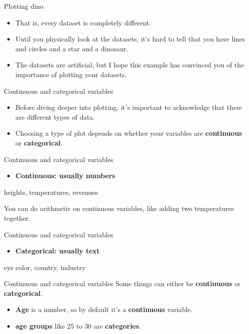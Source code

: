 \documentclass[
  ignorenonframetext,
]{beamer}
\providecommand{\tightlist}{%
  \setlength{\itemsep}{0pt}\setlength{\parskip}{0pt}}
\begin{document}
\begin{frame}{Plotting dino}
\label{plotting-dino-1}
\begin{itemize}
\item
  That is, every dataset is completely different.
\item
  Until you physically look at the datasets, it's hard to tell that you
  have lines and circles and a star and a dinosaur.
\item
  The datasets are artificial, but I hope this example has convinced you
  of the importance of plotting your datasets.
\end{itemize}
\end{frame}

\begin{frame}{Continuous and categorical variables}
\label{continuous-and-categorical-variables}
\begin{itemize}
\item
  Before diving deeper into plotting, it's important to acknowledge that
  there are different types of data.
\item
  Choosing a type of plot depends on whether your variables are
  \textbf{continuous} or \textbf{categorical}.
\end{itemize}
\end{frame}

\begin{frame}{Continuous and categorical variables}
\label{continuous-and-categorical-variables-1}
\begin{itemize}
\tightlist
\item
  \textbf{Continuous: usually numbers}
\end{itemize}

heights, temperatures, revenues

You can do arithmetic on continuous variables, like adding two
temperatures together.
\end{frame}

\begin{frame}{Continuous and categorical variables}
\label{continuous-and-categorical-variables-2}
\begin{itemize}
\tightlist
\item
  \textbf{Categorical: usually text}
\end{itemize}

eye color, country, industry
\end{frame}

\begin{frame}{Continuous and categorical variables}
\label{continuous-and-categorical-variables-3}
Some things can either be \textbf{continuous} or \textbf{categorical}.

\begin{itemize}
\item
  \textbf{Age} is a number, so by default it's a \textbf{continuous}
  variable.
\item
  \textbf{age groups} like 25 to 30 are \textbf{categories}.
\end{itemize}
\end{frame}
\end{document}
